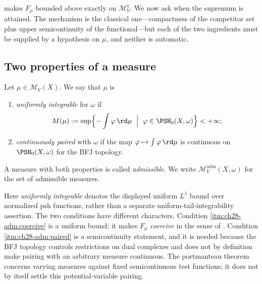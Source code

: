  makes $F_\mu$ bounded above exactly on
$\mathcal M^1_V$.  We now ask when the supremum is attained.  The
mechanism is the classical one---compactness of the competitor set plus
upper semicontinuity of the functional---but each of the two ingredients
must be supplied by a hypothesis on $\mu$, and neither is automatic.

\subsection{Two properties of a measure}
\label{sec:ch28-two-properties}

\begin{definition}
\label{def:ch28-admissible-measure}
Let $\mu\in\mathcal M_V(X)$.  We say that $\mu$ is
\begin{enumerate}
\item\label{itm:ch28-adm:coercive}
 \emph{uniformly integrable} for $\omega$ if
 \begin{equation}
 \label{eq:ch28-uniform-integrability}
  M(\mu):=\sup\Bigl\{-\int\varphi\,\rd\mu\ \Bigm|\
   \varphi\in\PSH_0(X,\omega)\Bigr\}<+\infty ;
 \end{equation}
\item\label{itm:ch28-adm:paired}
 \emph{continuously paired} with $\omega$ if the map
 $\varphi\mapsto\int\varphi\,\rd\mu$ is continuous on
 $\PSH_0(X,\omega)$ for the BFJ topology.
\end{enumerate}
A measure with both properties is called \emph{admissible}.  We write
$\mathcal M^{\mathrm{adm}}_V(X,\omega)$ for the set of admissible
measures.
\end{definition}

Here \emph{uniformly integrable} denotes the displayed uniform
$L^1$ bound over normalized psh functions, rather than a separate
uniform-tail-integrability assertion.
The two conditions have different characters.  Condition
\cref{itm:ch28-adm:coercive} is a uniform bound; it makes $F_\mu$
\emph{coercive} in the sense of \Cref{lem:ch28-coercivity}.  Condition
\cref{itm:ch28-adm:paired} is a semicontinuity statement, and it is needed
because the BFJ topology controls restrictions on dual complexes
and does not by definition make pairing with an arbitrary measure continuous.
The portmanteau theorem concerns varying measures against fixed
semicontinuous test functions; it does not by itself settle this
potential-variable pairing.

